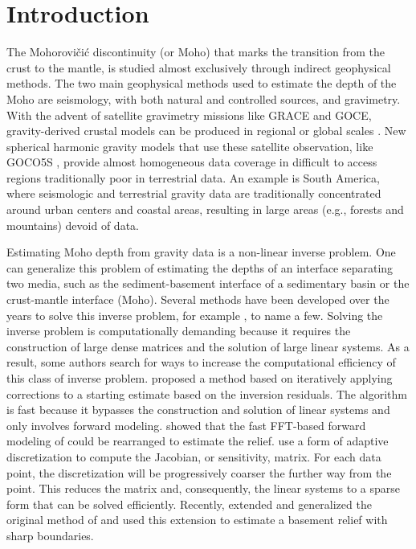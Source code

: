 \section{Introduction}

The Mohorovičić discontinuity (or Moho) that marks the transition from the
crust to the mantle, is studied almost exclusively through indirect geophysical
methods.
The two main geophysical methods used to estimate the depth of the Moho are
seismology, with both natural and controlled sources, and gravimetry.
With the advent of satellite gravimetry missions like GRACE and GOCE,
gravity-derived crustal models can be produced in regional or global scales
\citep[e.g. ][]{reguzzoni2013,vandermeijde2013,vandermeijde2015}.
New spherical harmonic gravity models that use these satellite observation,
like GOCO5S \citep{mayer-guerr2015}, provide almost homogeneous data coverage
in difficult to access regions traditionally poor in terrestrial data.
An example is South America, where seismologic and terrestrial gravity data
are traditionally concentrated around urban centers and coastal areas,
resulting in large areas (e.g., forests and mountains) devoid of data.

Estimating Moho depth from gravity data is a non-linear inverse problem.
One can generalize this problem of estimating the depths of an interface
separating two media,
such as the sediment-basement interface of a sedimentary basin or the
crust-mantle interface (Moho).
Several methods have been developed over the years to solve this inverse
problem, for example
\citet{bott1960, barbosa1999b, barbosa1999a, barnes2012, leao1996, martins2010,
martins2011, oldenburg1974, reguzzoni2013, santos2015, silva2006, silva2014},
to name a few.
Solving the inverse problem is computationally demanding because it requires
the construction of large dense matrices and the solution of large linear
systems.
As a result, some authors search for ways to increase the computational
efficiency of this class of inverse problem.
\citet{bott1960} proposed a method based on iteratively applying corrections to
a starting estimate based on the inversion residuals.
The algorithm is fast because it bypasses the construction and solution of
linear systems and only involves forward modeling.
\citet{oldenburg1974} showed that the fast FFT-based forward modeling of
\citet{parker1973} could be rearranged to estimate the relief.
\citet{barnes2012} use a form of adaptive discretization to compute the
Jacobian, or sensitivity, matrix.
For each data point, the discretization will be progressively coarser
the further way from the point.
This reduces the matrix and, consequently, the linear systems to a sparse form
that can be solved efficiently.
Recently, \citet{silva2014} extended and generalized the original method of
\citet{bott1960} and \citet{santos2015} used this extension to estimate a
basement relief with sharp boundaries.

